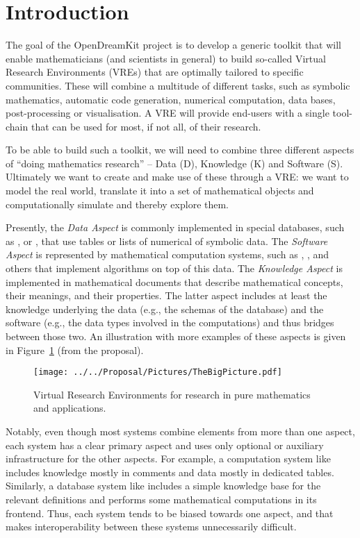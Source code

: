 \section{Introduction}\label{sec:intro}

The goal of the OpenDreamKit project is to develop a generic toolkit
that will enable mathematicians (and scientists in general) to build so-called Virtual
Research Environments (VREs) that are optimally tailored to specific communities. These
will combine a multitude of different tasks, such as symbolic mathematics, automatic code
generation, numerical computation, data bases, post-processing or visualisation. A VRE
will provide end-users with a single tool-chain that can be used for most, if not all, of
their research.

To be able to build such a toolkit, we will need to combine three different aspects of
``doing mathematics research'' -- Data (D), Knowledge (K) and Software (S). Ultimately we want to
create and make use of these through a VRE: we want to model the real world, translate it
into a set of mathematical objects and computationally simulate and thereby explore them.

Presently, the \emph{Data Aspect} is commonly implemented in special databases, such as
\LMFDB, \FindStat or \OEIS, that use tables or lists of numerical of symbolic data. The
\emph{Software Aspect} is represented by mathematical computation systems, such as \GAP,
\SageMath, and others that implement algorithms on top of this data. The \emph{Knowledge
  Aspect} is implemented in mathematical documents that describe mathematical concepts,
their meanings, and their properties.  The latter aspect includes at least the knowledge
underlying the data (e.g., the schemas of the database) and the software (e.g., the data
types involved in the computations) and thus bridges between those two. An illustration
with more examples of these aspects is given in Figure~\ref{fig:thebigpicture} (from the
\pn proposal).

\begin{figure}[ht]\centering
  \texttt{[image: ../../Proposal/Pictures/TheBigPicture.pdf]}
  \caption{Virtual Research Environments for research in pure
    mathematics and applications.}
  \label{fig:thebigpicture}
\end{figure}

Notably, even though most systems combine elements from more than one aspect, each system has a clear primary aspect and uses only optional or auxiliary infrastructure for the other aspects.
For example, a computation system like \SageMath includes knowledge mostly in comments and data mostly in dedicated tables.
Similarly, a database system like \LMFDB includes a simple knowledge base for the relevant definitions and performs some mathematical computations in its frontend.
Thus, each system tends to be biased towards one aspect, and that makes interoperability between these systems unnecessarily difficult.

